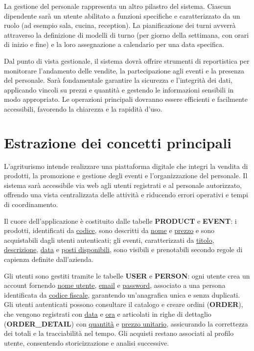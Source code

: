 \documentclass[a4paper,12pt]{report}
\begin{document}
La gestione del personale rappresenta un altro pilastro del sistema.
Ciascun dipendente sarà un utente abilitato a funzioni specifiche e
caratterizzato da un ruolo (ad esempio sala, cucina, reception). La
pianificazione dei turni avverrà attraverso la definizione di modelli
di turno (per giorno della settimana, con orari di inizio e fine) e
la loro assegnazione a calendario per una data specifica.

Dal punto di vista gestionale, il sistema dovrà offrire strumenti di
reportistica per monitorare l'andamento delle vendite, la
partecipazione agli eventi e la presenza del personale. Sarà
fondamentale garantire la sicurezza e l'integrità dei dati,
applicando vincoli su prezzi e quantità e gestendo le informazioni
sensibili in modo appropriato. Le operazioni principali dovranno
essere efficienti e facilmente accessibili, favorendo la chiarezza e
la rapidità d'uso.

\section{Estrazione dei concetti principali}
L'agriturismo intende realizzare una piattaforma digitale che integri
la vendita di prodotti, la promozione e gestione degli eventi e
l'organizzazione del personale. Il sistema sarà accessibile via web
agli utenti registrati e al personale autorizzato, offrendo una vista
centralizzata delle attività e riducendo errori operativi e tempi di
coordinamento.

Il cuore dell'applicazione è costituito dalle tabelle
\textbf{PRODUCT} e \textbf{EVENT}: i prodotti, identificati da
\underline{codice}, sono descritti da \underline{nome} e
\underline{prezzo} e sono acquistabili dagli utenti autenticati; gli
eventi, caratterizzati da \underline{titolo},
\underline{descrizione}, \underline{data} e \underline{posti
disponibili}, sono visibili e prenotabili secondo regole di capienza
definite dall'azienda.

Gli utenti sono gestiti tramite le tabelle \textbf{USER} e
\textbf{PERSON}: ogni utente crea un account fornendo \underline{nome
utente}, \underline{email} e \underline{password}, associato a una
persona identificata da \underline{codice fiscale}, garantendo
un'anagrafica unica e senza duplicati. Gli utenti autenticati possono
consultare il catalogo e creare ordini (\textbf{ORDER}), che vengono
registrati con \underline{data} e \underline{ora} e articolati in
righe di dettaglio (\textbf{ORDER\_DETAIL}) con \underline{quantità}
e \underline{prezzo unitario}, assicurando la correttezza dei totali
e la tracciabilità nel tempo. Gli acquisti restano associati al
profilo utente, consentendo storicizzazione e analisi successive.
\end{document}
